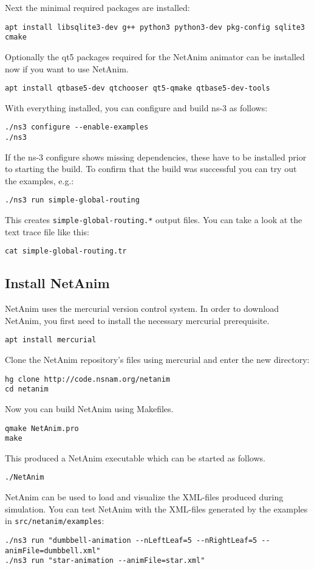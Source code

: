 Next the minimal required packages are installed:
\begin{verbatim}
apt install libsqlite3-dev g++ python3 python3-dev pkg-config sqlite3 cmake
\end{verbatim}
Optionally the qt5 packages required for the NetAnim animator can be installed now if you want to use NetAnim.
\begin{verbatim}
apt install qtbase5-dev qtchooser qt5-qmake qtbase5-dev-tools
\end{verbatim}
With everything installed, you can configure and build ns-3 as follows:
\begin{verbatim}
./ns3 configure --enable-examples
./ns3
\end{verbatim}
If the ns-3 configure shows missing dependencies, these have to be installed prior to starting the build.  
To confirm that the build was successful you can try out the examples, e.g.:
\begin{verbatim}
./ns3 run simple-global-routing
\end{verbatim}
This creates \texttt{simple-global-routing.*} output files. You can take a look at the text trace file like this:
\begin{verbatim}
cat simple-global-routing.tr
\end{verbatim}

\subsection{Install NetAnim}
\label{subsection:InstallNetAnim}
NetAnim uses the mercurial version control system. In order to download NetAnim, you first need to install the necessary mercurial prerequisite.
\begin{verbatim}
apt install mercurial
\end{verbatim}
Clone the NetAnim repository's files using mercurial and enter the new directory:
\begin{verbatim}
hg clone http://code.nsnam.org/netanim
cd netanim
\end{verbatim}
Now you can build NetAnim using Makefiles.
\begin{verbatim}
qmake NetAnim.pro
make
\end{verbatim}
This produced a NetAnim executable which can be started as follows.
\begin{verbatim}
./NetAnim
\end{verbatim}
NetAnim can be used to load and visualize the XML-files produced during simulation.  
You can test NetAnim with the XML-files generated by the examples in \texttt{src/netanim/examples}:
\begin{verbatim}
./ns3 run "dumbbell-animation --nLeftLeaf=5 --nRightLeaf=5 --animFile=dumbbell.xml"
./ns3 run "star-animation --animFile=star.xml"
\end{verbatim}

